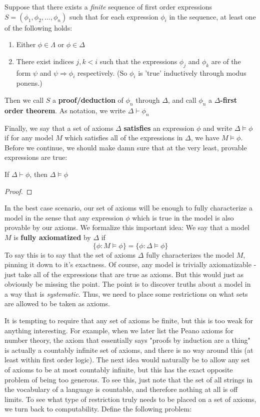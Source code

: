 \begin{definition}
    Suppose that there exists a \textit{finite} sequence of first order expressions $S = (\phi_1,\phi_2,...,\phi_n)$ such that for each expression $\phi_i$ in the sequence, at least one of the following holds:
    \begin{enumerate}
        \item Either $\phi \in \Lambda$ or $\phi \in \Delta$
        \item There exist indices $j,k<i$ such that the expressions $\phi_j$ and $\phi_k$ are of the form $\psi$ and $\psi \Rightarrow \phi_i$ respectively. (So $\phi_i$ is 'true' inductively through modus ponens.)
    \end{enumerate}
    Then we call $S$ a \textbf{proof/deduction} of $\phi_n$ through $\Delta$, and call $\phi_n$ a \textbf{$\Delta$-first order theorem}. As notation, we write $\Delta \vdash \phi_n$
\end{definition}
Finally, we say that a set of axioms $\Delta$ \textbf{satisfies} an expression $\phi$ and write $\Delta \models \phi$ if for any model $M$ which satisfies all of the expressions in $\Delta$, we have $M \models \phi$. Before we continue, we should make damn sure that at the very least, provable expressions are true: 
\begin{theorem}
    If $\Delta \vdash \phi$, then $\Delta \models \phi$
\end{theorem}
\begin{proof}
    
\end{proof}
In the best case scenario, our set of axioms will be enough to fully characterize a model in the sense that any expression $\phi$ which is true in the model is also provable by our axioms. We formalize this important idea: We say that a model $M$ is \textbf{fully axiomatized} by $\Delta$ if
\[\{\phi: M \models \phi\} = \{\phi: \Delta \models \phi\} \]
To say this is to say that the set of axioms $\Delta$ fully characterizes the model $M$, pinning it down to it's exactness. Of course, any model is trivially axiomatizable - just take all of the expressions that are true as axioms. But this would just as obviously be missing the point. The point is to discover truths about a model in a way that is \textit{systematic}. Thus, we need to place some restrictions on what sets are allowed to be taken as axioms.
\par It is tempting to require that any set of axioms be finite, but this is too weak for anything interesting. For example, when we later list the Peano axioms for number theory, the axiom that essentially says "proofs by induction are a thing" is actually a countably infinite set of axioms, and there is no way around this (at least within first order logic). The next idea would naturally be to allow any set of axioms to be at most countably infinite, but this has the exact opposite problem of being too generous. To see this, just note that the set of all strings in the vocabulary of a language is countable, and therefore nothing at all is off limits. To see what type of restriction truly needs to be placed on a set of axioms, we turn back to computability. Define the following problem:
